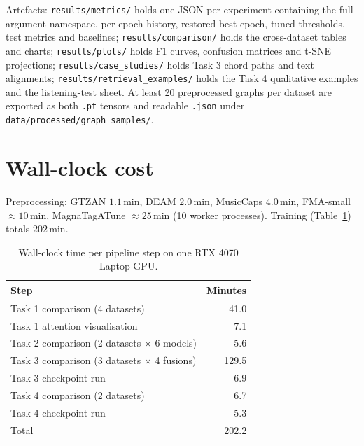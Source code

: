 \documentclass{article}
\begin{document}
Artefacts: \texttt{results/metrics/} holds one JSON per experiment containing the
full argument namespace, per-epoch history, restored best epoch, tuned thresholds,
test metrics and baselines; \texttt{results/comparison/} holds the cross-dataset
tables and charts; \texttt{results/plots/} holds F1 curves, confusion matrices and
t-SNE projections; \texttt{results/case\_studies/} holds Task 3 chord paths and
text alignments; \texttt{results/retrieval\_examples/} holds the Task 4
qualitative examples and the listening-test sheet. At least 20 preprocessed graphs
per dataset are exported as both \texttt{.pt} tensors and readable \texttt{.json}
under \texttt{data/processed/graph\_samples/}.

\section{Wall-clock cost}

Preprocessing: GTZAN $1.1$\,min, DEAM $2.0$\,min, MusicCaps $4.0$\,min, FMA-small
$\approx\!10$\,min, MagnaTagATune $\approx\!25$\,min (10 worker processes).
Training (Table~\ref{tab:timing}) totals $202$\,min.

\begin{table}[h]
\caption{Wall-clock time per pipeline step on one RTX 4070 Laptop GPU.}
\label{tab:timing}
\centering
\small
\begin{tabular}{lr}
\toprule
Step & Minutes \\
\midrule
Task 1 comparison (4 datasets)                & 41.0 \\
Task 1 attention visualisation                & 7.1 \\
Task 2 comparison (2 datasets $\times$ 6 models) & 5.6 \\
Task 3 comparison (3 datasets $\times$ 4 fusions) & 129.5 \\
Task 3 checkpoint run                         & 6.9 \\
Task 4 comparison (2 datasets)                & 6.7 \\
Task 4 checkpoint run                         & 5.3 \\
\midrule
Total                                         & 202.2 \\
\bottomrule
\end{tabular}
\end{table}
\end{document}

